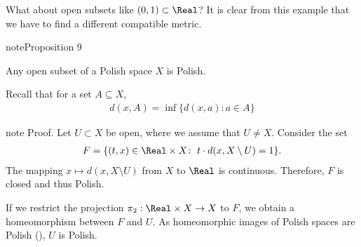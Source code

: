 \documentclass[letterpaper,10pt,english]{jupyterBook}
\begin{document}
\sphinxAtStartPar
What about open subsets like \((0,1) \subset \Real\)? It is clear from this example that we have to find a different compatible metric.
\label{subsets_Polish:prop-open-subset-Polish}
\begin{sphinxadmonition}{note}{Proposition 9}



\sphinxAtStartPar
Any open subset of a Polish space \(X\) is Polish.
\end{sphinxadmonition}

\begin{sphinxShadowBox}
\sphinxstylesidebartitle{}

\sphinxAtStartPar
Recall that for a set \(A \subseteq X\),
\begin{equation*}
\begin{split}
d(x,A) = \inf \{ d(x,a) \colon a \in A\}
\end{split}
\end{equation*}\end{sphinxShadowBox}

\begin{sphinxadmonition}{note}
\sphinxAtStartPar
Proof. Let \(U \subset X\) be open, where we assume that \(U \neq X\).  Consider the set
\begin{equation*}
\begin{split}
F = \{(t,x) \in \Real \times X \colon \; t \cdot d(x,X\setminus U) =1 \}.
\end{split}
\end{equation*}
\sphinxAtStartPar
The mapping \(x \mapsto d(x,X\setminus U)\) from \(X\) to \(\Real\) is continuous. Therefore, \(F\) is closed and thus Polish.

\sphinxAtStartPar
If we restrict the projection \(\pi_2: \Real \times X \to X\) to \(F\), we obtain a homeomorphism between \(F\) and \(U\). As homeomorphic images of Polish spaces are Polish ({\hyperref[\detokenize{polish:properties-polish}]{}}), \(U\) is Polish.
\end{sphinxadmonition}
\end{document}
